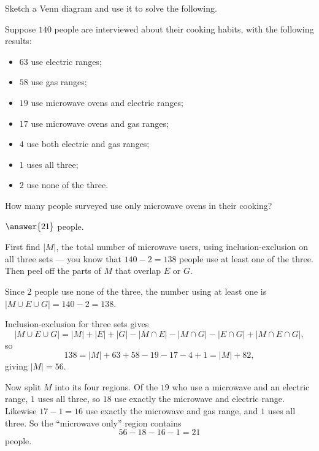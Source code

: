 \documentclass[12pt]{ximera}
\begin{document}
\begin{problem}
Sketch a Venn diagram and use it to solve the following.

Suppose $140$ people are interviewed about their cooking habits, with the following
results:
\begin{itemize}
    \item $63$ use electric ranges;
    \item $58$ use gas ranges;
    \item $19$ use microwave ovens and electric ranges;
    \item $17$ use microwave ovens and gas ranges;
    \item $4$ use both electric and gas ranges;
    \item $1$ uses all three;
    \item $2$ use none of the three.
\end{itemize}

\begin{prompt}
How many people surveyed use only microwave ovens in their cooking?

$\answer{21}$ people.

\begin{hint}
First find $|M|$, the total number of microwave users, using inclusion-exclusion on
all three sets --- you know that $140-2=138$ people use at least one of the three.
Then peel off the parts of $M$ that overlap $E$ or $G$.
\end{hint}

\begin{feedback}
Since $2$ people use none of the three, the number using at least one is
$|M\cup E\cup G|=140-2=138$.

Inclusion-exclusion for three sets gives
\[
|M\cup E\cup G|=|M|+|E|+|G|-|M\cap E|-|M\cap G|-|E\cap G|+|M\cap E\cap G|,
\]
so
\[
138 = |M| + 63 + 58 - 19 - 17 - 4 + 1 = |M| + 82,
\]
giving $|M|=56$.

Now split $M$ into its four regions. Of the $19$ who use a microwave and an electric
range, $1$ uses all three, so $18$ use exactly the microwave and electric range.
Likewise $17-1=16$ use exactly the microwave and gas range, and $1$ uses all three.
So the ``microwave only'' region contains
\[ 56 - 18 - 16 - 1 = 21 \]
people.
\end{feedback}
\end{prompt}
\end{problem}
\end{document}
